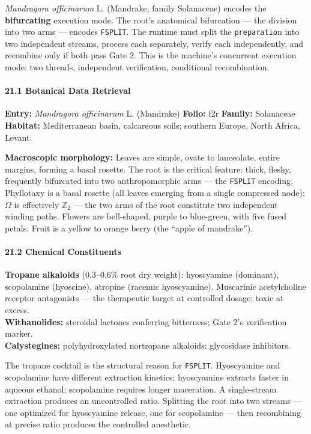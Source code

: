 \emph{Mandragora officinarum} L. (Mandrake, family Solanaceae) encodes
the \textbf{bifurcating} execution mode. The root's anatomical
bifurcation --- the division into two arms --- encodes \texttt{FSPLIT}.
The runtime must split the \texttt{preparatio}n into two independent
streams, process each separately, verify each independently, and
recombine only if both pass Gate 2. This is the machine's concurrent
execution mode: two threads, independent verification, conditional
recombination.

\hypertarget{botanical-data-retrieval-1}{%
\paragraph{21.1 Botanical Data
Retrieval}\label{botanical-data-retrieval-1}}

\textbf{Entry:} \emph{Mandragora officinarum} L. (Mandrake)
\textbf{Folio:} f2r \textbf{Family:} Solanaceae \textbf{Habitat:}
Mediterranean basin, calcareous soils; southern Europe, North Africa,
Levant.

\textbf{Macroscopic morphology:} Leaves are simple, ovate to lanceolate,
entire margins, forming a basal rosette. The root is the critical
feature: thick, fleshy, frequently bifurcated into two anthropomorphic
arms --- the \texttt{FSPLIT} encoding. Phyllotaxy is a basal rosette
(all leaves emerging from a single compressed node); \(\Omega\) is
effectively \(\mathbb{Z}_2\) --- the two arms of the root constitute two
independent winding paths. Flowers are bell-shaped, purple to
blue-green, with five fused petals. Fruit is a yellow to orange berry
(the ``apple of mandrake'').

\hypertarget{chemical-constituents-1}{%
\paragraph{21.2 Chemical Constituents}\label{chemical-constituents-1}}

\textbf{Tropane alkaloids} (0.3--0.6\% root dry weight): hyoscyamine
(dominant), scopolamine (hyoscine), atropine (racemic hyoscyamine).
Muscarinic acetylcholine receptor antagonists --- the therapeutic target
at controlled dosage; toxic at excess.\\
\textbf{Withanolides:} steroidal lactones conferring bitterness; Gate
2's verification marker.\\
\textbf{Calystegines:} polyhydroxylated nortropane alkaloids;
glycosidase inhibitors.

The tropane cocktail is the structural reason for \texttt{FSPLIT}.
Hyoscyamine and scopolamine have different extraction kinetics:
hyoscyamine extracts faster in aqueous ethanol; scopolamine requires
longer maceration. A single-stream extraction produces an uncontrolled
ratio. Splitting the root into two streams --- one optimized for
hyoscyamine release, one for scopolamine --- then recombining at precise
ratio produces the controlled anesthetic.

